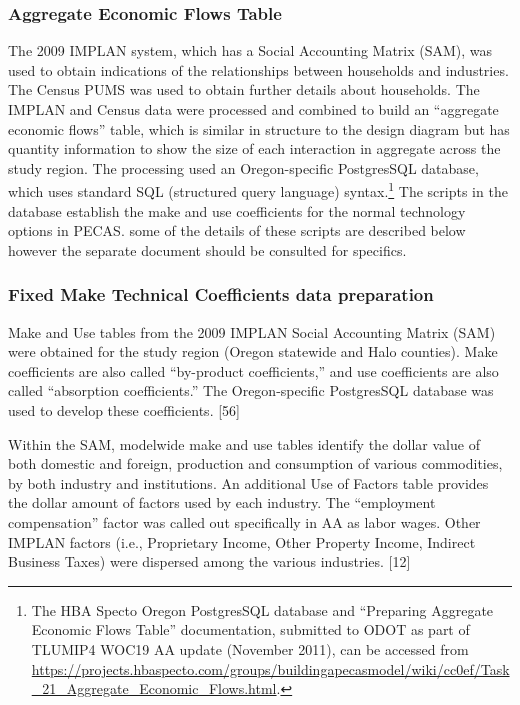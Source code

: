 \subsubsection{Aggregate Economic Flows Table}
The 2009 IMPLAN system, which has a Social Accounting Matrix (SAM), was used to obtain indications of the relationships between households and industries. The Census PUMS was used to obtain further details about households. The IMPLAN  and Census data were processed and combined  to build an ``aggregate economic flows'' table, which is similar in structure to the design diagram but has quantity information to show the size of each interaction in aggregate across the study region. The processing used an Oregon-specific PostgresSQL database, which uses standard SQL (structured query language) syntax.\footnote{The HBA Specto Oregon PostgresSQL database and ``Preparing Aggregate Economic Flows Table'' documentation, submitted to ODOT as part of TLUMIP4 WOC19 AA update (November 2011), can be accessed from \url{https://projects.hbaspecto.com/groups/buildingapecasmodel/wiki/cc0ef/Task_21_Aggregate_Economic_Flows.html}.} The scripts in the database establish the make and use coefficients for the normal technology options in PECAS. some of the details of these scripts are described below however the separate document should be consulted for specifics.  


\subsubsection{Fixed Make Technical Coefficients data preparation}
Make and Use tables from the 2009 IMPLAN Social Accounting Matrix (SAM) were obtained for the study region (Oregon statewide and Halo counties). Make coefficients are also called ``by-product coefficients,'' and use coefficients are also called ``absorption coefficients.'' The Oregon-specific PostgresSQL database was used to develop these coefficients. [56]

Within the SAM, modelwide make and use tables identify the dollar value of both domestic and foreign, production and consumption of various commodities, by both industry and institutions. An additional Use of Factors table provides the dollar amount of factors used by each industry. The ``employment compensation'' factor was called out specifically in AA as labor wages. Other IMPLAN factors (i.e., Proprietary Income, Other Property Income, Indirect Business Taxes) were dispersed among the various industries. [12] 

